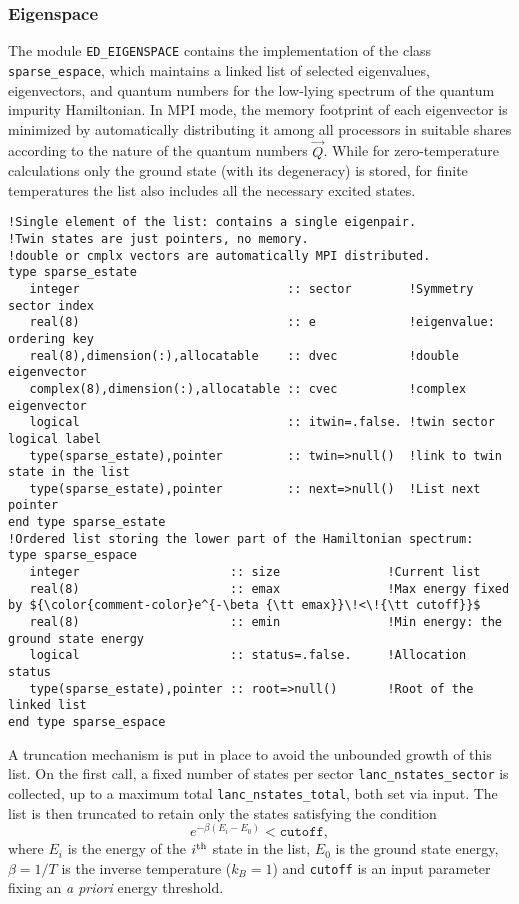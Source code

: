 \documentclass[edipack_sp.tex]{subfiles}
\begin{document}
  

  
\subsubsection{Eigenspace}\label{CodeEigenspace}
The module {\tt ED\_EIGENSPACE} contains the implementation of the 
class {\tt sparse\_espace}, which maintains a linked list 
of selected eigenvalues, eigenvectors, and quantum numbers for the 
low-lying spectrum of the quantum impurity Hamiltonian. 
In MPI mode, the memory footprint of each eigenvector 
is minimized by automatically distributing it among all processors in suitable shares
according to the nature of the quantum numbers $\vec{Q}$.
While for zero-temperature calculations only the ground state (with its
degeneracy) is stored, for finite temperatures the list also includes all the necessary excited states.


\begin{lstlisting}[style=fstyle,numbers=none]    
!Single element of the list: contains a single eigenpair.
!Twin states are just pointers, no memory.
!double or cmplx vectors are automatically MPI distributed.
type sparse_estate
   integer                             :: sector        !Symmetry sector index
   real(8)                             :: e             !eigenvalue: ordering key
   real(8),dimension(:),allocatable    :: dvec          !double  eigenvector
   complex(8),dimension(:),allocatable :: cvec          !complex eigenvector
   logical                             :: itwin=.false. !twin sector logical label
   type(sparse_estate),pointer         :: twin=>null()  !link to twin state in the list
   type(sparse_estate),pointer         :: next=>null()  !List next pointer
end type sparse_estate
!Ordered list storing the lower part of the Hamiltonian spectrum: 
type sparse_espace
   integer                     :: size               !Current list
   real(8)                     :: emax               !Max energy fixed by ${\color{comment-color}e^{-\beta {\tt emax}}\!<\!{\tt cutoff}}$
   real(8)                     :: emin               !Min energy: the ground state energy
   logical                     :: status=.false.     !Allocation status
   type(sparse_estate),pointer :: root=>null()       !Root of the linked list
end type sparse_espace

\end{lstlisting}
A truncation mechanism is put in place to avoid the unbounded growth of this list. On the first call, a fixed number of
states per sector  
\texttt{lanc\_nstates\_sector} is collected, up to a
maximum total \texttt{lanc\_nstates\_total}, both set via input.  
The list is then truncated to retain only the states satisfying the condition 
$$
e^{-\beta(E_i-E_0)} < \mathtt{cutoff}, 
$$
where
$E_i$ is the energy of the $i^{\rm th}$ state in the list, $E_0$ is the
ground state energy, $\beta=1/T$ is the inverse temperature ($k_B=1$) and \texttt{cutoff} is an input parameter fixing an {\it a priori} energy threshold.
\end{document}
